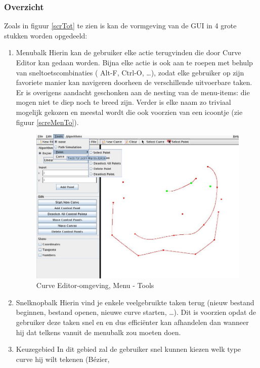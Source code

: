 \documentclass[a4paper,11pt,oneside, titlepage]{article}
\begin{document}
\subsubsection{Overzicht}
Zoals in figuur \ref{scrTot} te zien is kan de vormgeving van de GUI in 4 grote stukken worden opgedeeld:
\begin{enumerate}
\item Menubalk\newline
Hierin kan de gebruiker elke actie terugvinden die door Curve Editor kan gedaan worden.
Bijna elke actie is ook aan te roepen met behulp van sneltoetscombinaties ( Alt-F, Ctrl-O, \ldots ), zodat
elke gebruiker op zijn favoriete manier kan navigeren doorheen de verschillende uitvoerbare taken.
Er is overigens aandacht geschonken aan de nesting van de menu-items: die mogen niet te diep noch te breed zijn.
Verder is elke naam zo triviaal mogelijk gekozen en meestal wordt die ook voorzien van een icoontje (zie figuur \ref{screMenTo}).
\begin{figure}[htbp]
\centering
\includegraphics[scale=0.4]{./screenies/menuTools.jpg}
\caption{Curve Editor-omgeving, Menu - Tools}\label{scrMenTo}
\end{figure}
\item Snelknopbalk
Hierin vind je enkele veelgebruikte taken terug (nieuw bestand beginnen, bestand openen, 
nieuwe curve starten, \ldots). Dit is voorzien opdat de gebruiker deze taken snel en en dus effici\"enter kan
afhandelen dan wanneer hij dat telkens vanuit de menubalk zou moeten doen.
\item Keuzegebied\newline
In dit gebied zal de gebruiker snel kunnen kiezen welk type curve hij wilt tekenen (B\'ezier, 

\end{enumerate}
\end{document}
